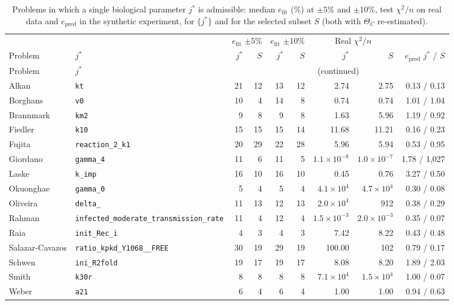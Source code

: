 {\small
\begin{longtable}{@{}>{\raggedright\arraybackslash}p{2.2cm}>{\raggedright\arraybackslash}p{3.0cm}rrrrrrr@{}}
\caption{Problems in which a single biological parameter $j^\ast$ is admissible: median $e_{\mathrm{fit}}$ (\%) at $\pm5\%$ and $\pm10\%$, test $\chi^2/n$ on real data and $e_{\mathrm{pred}}$ in the synthetic experiment, for $\{j^\ast\}$ and for the selected subset $S$ (both with $\Theta_C$ re-estimated).}\label{tab:single}\\
\toprule & & \multicolumn{2}{c}{$e_{\mathrm{fit}}$ $\pm5\%$} & \multicolumn{2}{c}{$e_{\mathrm{fit}}$ $\pm10\%$} & \multicolumn{2}{c}{Real $\chi^2/n$} & \\ \cmidrule(lr){3-4}\cmidrule(lr){5-6}\cmidrule(lr){7-8}
Problem & $j^\ast$ & $j^\ast$ & $S$ & $j^\ast$ & $S$ & $j^\ast$ & $S$ & $e_{\mathrm{pred}}$ $j^\ast$ / $S$ \\ \midrule \endfirsthead
\toprule Problem & $j^\ast$ & \multicolumn{7}{c}{(continued)} \\ \midrule \endhead
Alkan & \texttt{kt} & 21 & 12 & 13 & 12 & 2.74 & 2.75 & 0.13 / 0.13 \\
Borghans & \texttt{v0} & 10 & 4 & 14 & 8 & 0.74 & 0.74 & 1.01 / 1.04 \\
Brannmark & \texttt{km2} & 9 & 8 & 9 & 8 & 1.63 & 5.96 & 1.19 / 0.92 \\
Fiedler & \texttt{k10} & 15 & 15 & 15 & 14 & 11.68 & 11.21 & 0.16 / 0.23 \\
Fujita & \texttt{reaction\_\allowbreak{}2\_\allowbreak{}k1} & 20 & 29 & 22 & 28 & 5.96 & 5.94 & 0.53 / 0.95 \\
Giordano & \texttt{gamma\_4} & 11 & 6 & 11 & 5 & $1.1\times10^{-8}$ & $1.0\times10^{-7}$ & 1.78 / 1,027 \\
Laske & \texttt{k\_imp} & 16 & 10 & 16 & 10 & 0.45 & 0.76 & 3.27 / 0.50 \\
Okuonghae & \texttt{gamma\_0} & 5 & 4 & 5 & 4 & $4.1\times10^{4}$ & $4.7\times10^{4}$ & 0.30 / 0.08 \\
Oliveira & \texttt{delta\_} & 11 & 13 & 12 & 13 & $2.0\times10^{4}$ & 912 & 0.38 / 0.29 \\
Rahman & \texttt{infected\_\allowbreak{}moderate\_\allowbreak{}transmission\_\allowbreak{}rate} & 11 & 4 & 12 & 4 & $1.5\times10^{-3}$ & $2.0\times10^{-3}$ & 0.35 / 0.07 \\
Raia & \texttt{init\_Rec\_i} & 4 & 3 & 4 & 3 & 7.42 & 8.22 & 0.43 / 0.48 \\
Salazar-Cavazos & \texttt{ratio\_\allowbreak{}kpkd\_\allowbreak{}Y1068\_\allowbreak{}\_\allowbreak{}FREE} & 30 & 19 & 29 & 19 & 100.00 & 102 & 0.79 / 0.17 \\
Schwen & \texttt{ini\_R2fold} & 19 & 17 & 19 & 17 & 8.08 & 8.20 & 1.89 / 2.03 \\
Smith & \texttt{k30r} & 8 & 8 & 8 & 8 & $7.1\times10^{4}$ & $1.5\times10^{4}$ & 1.00 / 0.07 \\
Weber & \texttt{a21} & 6 & 4 & 6 & 4 & 1.00 & 1.00 & 0.94 / 0.63 \\
\bottomrule \end{longtable}}

